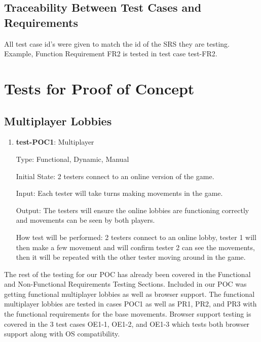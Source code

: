 \documentclass[12pt, titlepage]{article}
\begin{document}
\subsection{Traceability Between Test Cases and Requirements}

All test case id's were given to match the id of the SRS they are testing. Example, Function Requirement FR2 is tested in test case test-FR2.

\section{Tests for Proof of Concept}

\subsection{Multiplayer Lobbies}
		
\begin{enumerate}

\item{\textbf{test-POC1}: Multiplayer\\}

Type: Functional, Dynamic, Manual
					
Initial State: 2 testers connect to an online version of the game.
					
Input: Each tester will take turns making movements in the game.

Output: The testers will ensure the online lobbies are functioning correctly and movements can be seen by both players.
					
How test will be performed: 2 testers connect to an online lobby, tester 1 will then make a few movement and will confirm tester 2 can see the movements, then it will be repeated with the other tester moving around in the game.
					
\end{enumerate}

\parindent

The rest of the testing for our POC has already been covered in the Functional and Non-Functional Requirements Testing Sections. Included in our POC was getting functional multiplayer lobbies as well as browser support. The functional multiplayer lobbies are tested in cases POC1 as well as PR1, PR2, and PR3 with the functional requirements for the base movements. Browser support testing is covered in the 3 test cases OE1-1, OE1-2, and OE1-3 which tests both browser support along with OS compatibility.
	
\end{document}
